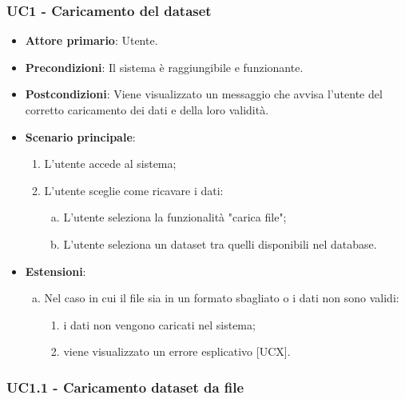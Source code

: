 \subsubsection{UC1 - Caricamento del dataset}

\begin{figure}[h]
\centering
\end{figure}


\begin{itemize}
	\item \textbf{Attore primario}: Utente.
	\item \textbf{Precondizioni}: Il sistema è raggiungibile e funzionante.
	\item \textbf{Postcondizioni}: Viene visualizzato un messaggio che avvisa l'utente del corretto caricamento dei dati e della loro validità.
	\item \textbf{Scenario principale}:
		\begin{enumerate}
			\item L'utente accede al sistema;
			\item L'utente sceglie come ricavare i dati:
				\begin{enumerate}[(a)]
			\item L'utente seleziona la funzionalità "carica file";
			\item L'utente seleziona un dataset tra quelli disponibili nel database.
				\end{enumerate}
		\end{enumerate}
	\item \textbf{Estensioni}:
	\begin{enumerate}[(a)]
		\item Nel caso in cui il file sia in un formato sbagliato o i dati non sono validi:
		\begin{enumerate}[1.]
			\item i dati non vengono caricati nel sistema;
			\item viene visualizzato un errore esplicativo [UCX].
		\end{enumerate}
	\end{enumerate}
\end{itemize}

\subsubsection{UC1.1 - Caricamento dataset da file}

